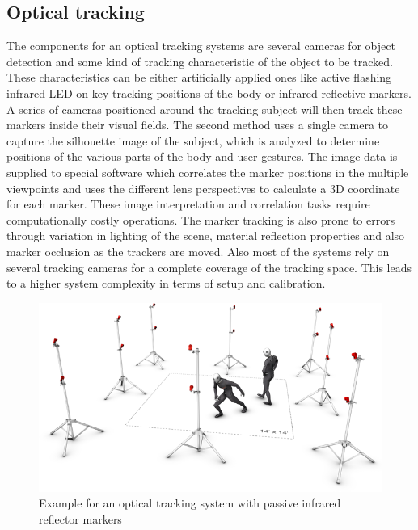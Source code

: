 \subsection{Optical tracking}
The components for an optical tracking systems are several cameras for object detection and some kind of tracking characteristic of the object to be tracked. These characteristics can be either artificially applied ones like active flashing infrared LED on key tracking positions of the body or infrared reflective markers. A series of cameras positioned around the tracking subject will then track these markers inside their visual fields. The second method uses a single camera to capture the silhouette image of the subject, which is analyzed to determine positions of the various parts of the body and user gestures.
The image data is supplied to special software which correlates the marker positions in the multiple viewpoints and uses the different lens perspectives to calculate a 3D coordinate for each marker. These image interpretation and correlation tasks require computationally costly operations. The marker tracking is also prone to errors through variation in lighting of the scene, material reflection properties and also marker occlusion as the trackers are moved. Also most of the systems rely on several tracking cameras for a complete coverage of the tracking space. This leads to a higher system complexity in terms of setup and calibration.
\begin{figure}[H]
\label{optic reflector tracking}
\includegraphics[scale=0.6]{images/flex13MocapVolume.png} 
\caption{Example for an optical tracking system with passive infrared reflector markers \cite{optitrack.2017}}
\end{figure}
